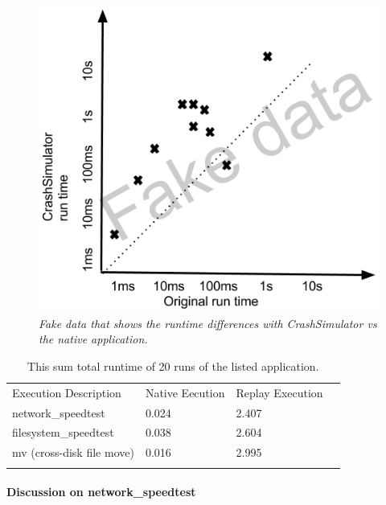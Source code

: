     \begin{figure}[t]
        \center{}
        \includegraphics[scale=.5]{FakeTimeEval}
        \caption{\emph{Fake data that shows the runtime differences with
CrashSimulator vs the native application.}}

    \end{figure}


    \begin{table}[H]
        \scriptsize{}
        \begin{tabular}{l  l  l  l}
            \toprule{}
                Execution Description & Native Eecution & Replay Execution\\
                network\_speedtest & 0.024 & 2.407 \\
                filesystem\_speedtest & 0.038 & 2.604 \\
                mv (cross-disk file move) & 0.016 & 2.995 \\
            \bottomrule{}
        \end{tabular}
        \caption{This sum total runtime of 20 runs of the listed application.}
    \end{table}


\paragraph{Discussion on network\_speedtest}

